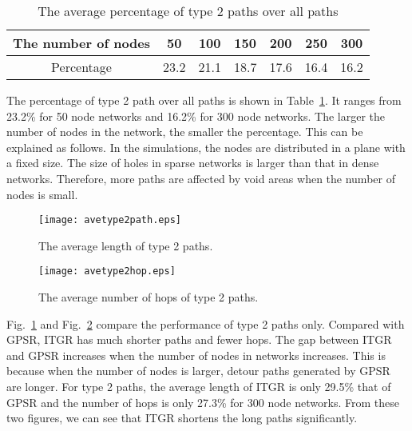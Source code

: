 \documentclass[3p,times]{elsarticle}
\begin{document}
\begin{table}[htp]
\caption{The average  percentage of type 2 paths over all paths}
\centering          \begin{tabular}{|c| c| c| c| c| c| c|}    \hline                        The number of nodes & 50 & 100 & 150 & 200 & 250 & 300 \\ [0.5ex]  \hline                     Percentage &23.2&21.1&18.7&17.6&16.4&16.2 \\      [1ex]        \hline          \end{tabular}
\label{table2}    \end{table}


The percentage of type 2
path over all paths  is shown in Table~\ref{table2}.
It ranges from 23.2\% for 50 node networks and 16.2\% for 300 node networks.
The larger the number of nodes in the network, the smaller the percentage.
This can be explained as follows.
In the simulations, the nodes are distributed in a plane with a fixed size.
The size of holes in sparse networks is larger than
that in dense networks.
Therefore, more paths are affected by void areas when the number of nodes is small.






\begin{figure}[!htp]
\begin{center}
\texttt{[image: avetype2path.eps]}
\end{center}
\caption{The average length of type 2 paths.}
\label{fig19}
\end{figure}

\begin{figure}[htp]
\begin{center}
\texttt{[image: avetype2hop.eps]}
\end{center}
\caption{The average number of hops of type 2 paths.}
\label{fig20}
\end{figure}


Fig.~\ref{fig19} and  Fig.~\ref{fig20} compare the performance of type 2 paths only.
Compared with GPSR,
ITGR has much shorter paths and fewer hops.
The gap between  ITGR and GPSR increases when the number of nodes in networks increases.
This is because when the number of nodes is larger,
detour paths generated by GPSR are longer.
For type 2 paths, the average length of ITGR is only 29.5\%
that of GPSR and the number of hops is only 27.3\% for 300 node networks.
From these two figures, we can see that ITGR shortens the long paths significantly.
\end{document}
